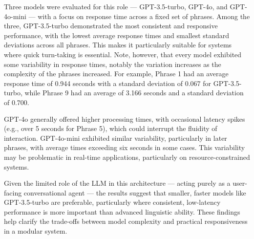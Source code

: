 Three models were evaluated for this role — GPT-3.5-turbo, GPT-4o, and GPT-4o-mini — with a focus on response time across a fixed set of phrases. Among the three, GPT-3.5-turbo demonstrated the most consistent and responsive performance, with the lowest average response times and smallest standard deviations across all phrases. This makes it particularly suitable for systems where quick turn-taking is essential. Note, however, that every model exhibited some variability in response times, notably the variation increases as the complexity of the phrases increased. For example, Phrase 1 had an average response time of 0.944 seconds with a standard deviation of 0.067 for GPT-3.5-turbo, while Phrase 9 had an average of 3.166 seconds and a standard deviation of 0.700.

GPT-4o generally offered higher processing times, with occasional latency spikes (e.g., over 5 seconds for Phrase 5), which could interrupt the fluidity of interaction. GPT-4o-mini exhibited similar variability, particularly in later phrases, with average times exceeding six seconds in some cases. This variability may be problematic in real-time applications, particularly on resource-constrained systems.

Given the limited role of the LLM in this architecture — acting purely as a user-facing conversational agent — the results suggest that smaller, faster models like GPT-3.5-turbo are preferable, particularly where consistent, low-latency performance is more important than advanced linguistic ability. These findings help clarify the trade-offs between model complexity and practical responsiveness in a modular system.